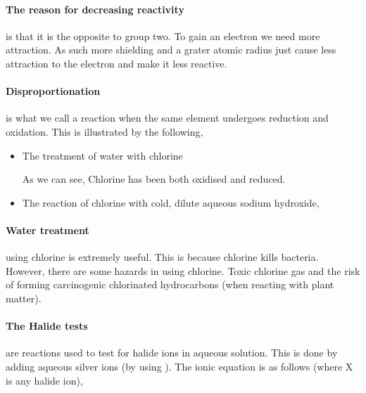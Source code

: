 \documentclass[11pt,a4paper]{memoir}
\begin{document}
	\paragraph{The reason for decreasing reactivity} is that it is the opposite to group two. To gain an electron we need more attraction. As such more shielding and a grater atomic radius just cause less attraction to the electron and make it less reactive.
	
	\paragraph{Disproportionation} is what we call a reaction when the same element undergoes reduction and oxidation. This is illustrated by the following,
	\begin{itemize}
		\item The treatment of water with chlorine
		
		
		As we can see, Chlorine has been both oxidised and reduced.
		
		\item The reaction of chlorine with cold, dilute aqueous sodium hydroxide,
		
	\end{itemize}
	
	\paragraph{Water treatment} using chlorine is extremely useful. This is because chlorine kills bacteria. However, there are some hazards in using chlorine. Toxic chlorine gas and the risk of forming carcinogenic chlorinated hydrocarbons (when reacting with plant matter).
	
	\paragraph{The Halide tests} are reactions used to test for halide ions in aqueous solution. This is done by adding aqueous silver ions (by using ). The ionic equation is as follows (where X is any halide ion),
	
	\begin{center}
	\end{center}
	
\end{document}
